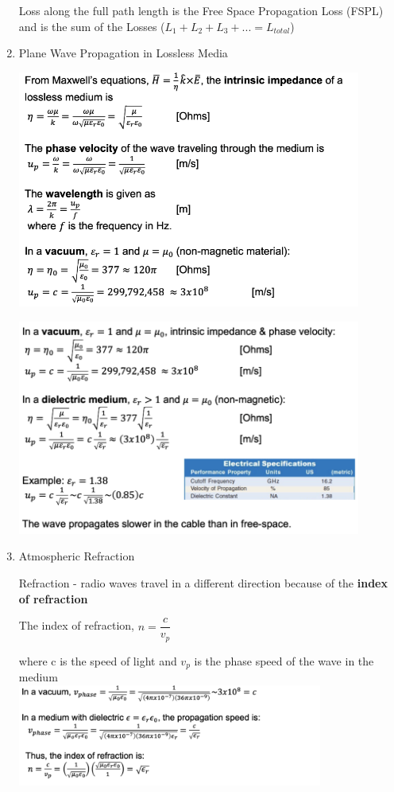 \documentclass[10pt]{article}
\renewcommand{\frac}{\dfrac}
\begin{document}
\begin{enumerate}
	Loss along the full path length is the Free Space Propagation Loss (FSPL) and is the sum of the Losses ($L_1 + L_2 + L_3 + ... = L_{total}$)
	
	\item Plane Wave Propagation in Lossless Media
	
	\includegraphics[width=0.89\textwidth]{figs/LosslessMedia1.png}
	
	\includegraphics[width=0.89\textwidth]{figs/LosslessMedia2.png}
	
	\item Atmospheric Refraction
	
	Refraction - radio waves travel in a different direction because of the {\bf index of refraction}
	
	\centerline{The index of refraction, $n = \frac{c}{v_p}$}
	
	where c is the speed of light and $v_p$ is the phase speed of the wave in the medium \\
	
	\includegraphics[width=0.79\textwidth]{figs/Refraction.png}
	

\end{enumerate}
\end{document}
